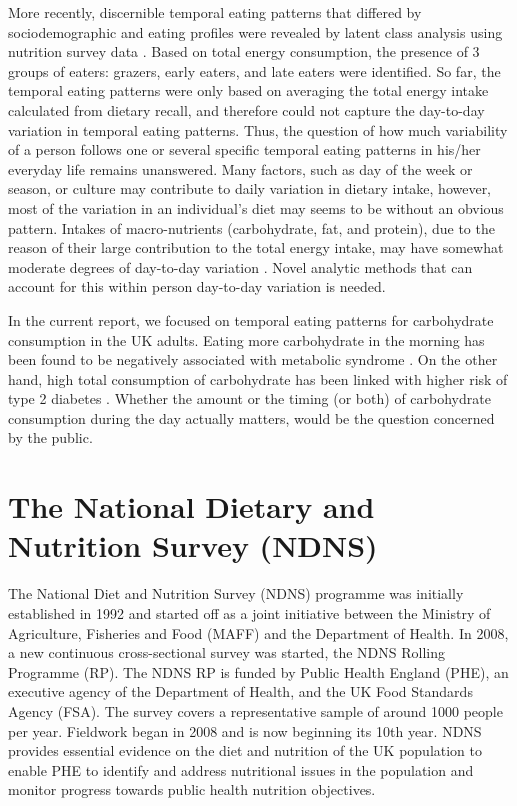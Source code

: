 More recently, discernible temporal eating patterns that differed by sociodemographic and eating profiles were revealed by latent class analysis using nutrition survey data \parencite{leech2017temporal, Mansukhani2018}. Based on total energy consumption, the presence of 3 groups of eaters: grazers, early eaters, and late eaters were identified. So far, the temporal eating patterns were only based on averaging the total energy intake calculated from dietary recall, and therefore could not capture the day-to-day variation in temporal eating patterns. Thus, the question of how much variability of a person follows one or several specific temporal eating patterns in his/her everyday life remains unanswered. Many factors, such as day of the week or season, or culture may contribute to daily variation in dietary intake, however, most of the variation in an individual's diet may seems to be without an obvious pattern. Intakes of macro-nutrients (carbohydrate, fat, and protein), due to the reason of their large contribution to the total energy intake, may have somewhat moderate degrees of day-to-day variation \parencite{willett2012nutritional}. Novel analytic methods that can account for this within person day-to-day variation is needed. 

In the current report, we focused on temporal eating patterns for carbohydrate consumption in the UK adults. Eating more carbohydrate in the morning has been found to be negatively associated with metabolic syndrome \parencite{almoosawi2013time}. On the other hand, high total consumption of carbohydrate has been linked with higher risk of type 2 diabetes \parencite{alhazmi2012macronutrient}. Whether the amount or the timing (or both) of carbohydrate consumption during the day actually matters, would be the question concerned by the public. 




\section{The National Dietary and Nutrition Survey (NDNS)}\vspace{-0.3cm}

The National Diet and Nutrition Survey (NDNS) programme \parencite{NDNSdatabase2018} was initially established in 1992 and started off as a joint initiative between the Ministry of Agriculture, Fisheries and Food (MAFF) and the Department of Health. In 2008, a new continuous cross-sectional survey was started, the NDNS Rolling Programme (RP). The NDNS RP is funded by Public Health England (PHE), an executive agency of the Department of Health, and the UK Food Standards Agency (FSA). The survey covers a representative sample of around 1000 people per year. Fieldwork began in 2008 and is now beginning its 10th year. NDNS provides essential evidence on the diet and nutrition of the UK population to enable PHE to identify and address nutritional issues in the population and monitor progress towards public health nutrition objectives.

